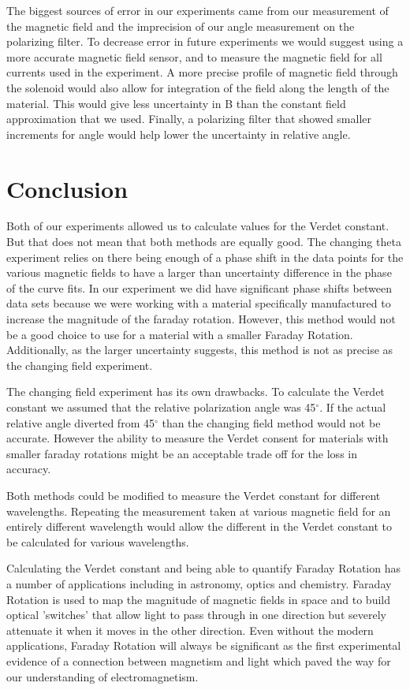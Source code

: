 \documentclass[prb,preprint]{revtex4-1}
\begin{document}
The biggest sources of error in our experiments came from our measurement of the magnetic field and the imprecision of our angle measurement on the polarizing filter. To decrease error in future experiments we would suggest using a more accurate magnetic field sensor, and to measure the magnetic field for all currents used in the experiment. A more precise profile of magnetic field through the solenoid would also allow for integration of the field along the length of the material. This would give less uncertainty in B than the constant field approximation that we used. Finally, a polarizing filter that showed smaller increments for angle would help lower the uncertainty in relative angle. 

\section{Conclusion}

Both of our experiments allowed us to calculate values for the Verdet constant. But that does not mean that both methods are equally good. The changing theta experiment relies on there being enough of a phase shift in the data points for the various magnetic fields to have a larger than uncertainty difference in the phase of the curve fits. In our experiment we did have significant phase shifts between data sets because we were working with a material specifically manufactured to increase the magnitude of the faraday rotation. However, this method would not be a good choice to use for a material with a smaller Faraday Rotation. Additionally, as the larger uncertainty suggests, this method is not as precise as the changing field experiment.

The changing field experiment has its own drawbacks. To calculate the Verdet constant we assumed that the relative polarization angle was 45$^{\circ}$. If the actual relative angle diverted from 45$^{\circ}$ than the changing field method would not be accurate. However the ability to measure the Verdet consent for materials with smaller faraday rotations might be an acceptable trade off for the loss in accuracy.

Both methods could be modified to measure the Verdet constant for different wavelengths. Repeating the measurement taken at various magnetic field for an entirely different wavelength would allow the different in the Verdet constant to be calculated for various wavelengths.

Calculating the Verdet constant and being able to quantify Faraday Rotation has a number of applications including in astronomy, optics and chemistry. Faraday Rotation is used to map the magnitude of magnetic fields in space and to build optical 'switches' that allow light to pass through in one direction but severely attenuate it when it moves in the other direction. Even without the modern applications, Faraday Rotation will always be significant as the first experimental evidence of a connection between magnetism and light which paved the way for our understanding of electromagnetism.
 
\end{document}
